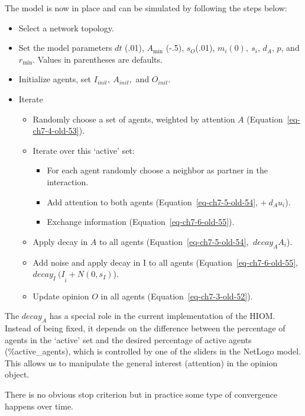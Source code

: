 \documentclass[
  letterpaper,
]{scrbook}
\begin{document}
The model is now in place and can be simulated by following the steps
below:

\begin{itemize}
\item
  Select a network topology.
\item
  Set the model parameters \(dt\) (.01), \(A_{\min}\) (-.5),
  \(s_{O}\)(.01), \(m_{i}(0),\ s_{i}\), \(d_{A}\), \(p\), and
  \(r_{\min}\). Values in parentheses are defaults.
\item
  Initialize agents, set \(I_{init},\ A_{init},\) and \(O_{init}\).
\item
  Iterate

  \begin{itemize}
  \item
    Randomly choose a set of agents, weighted by attention \(A\)
    (Equation~\ref{eq-ch7-4-old-53}).
  \item
    Iterate over this `active' set:

    \begin{itemize}
    \item
      For each agent randomly choose a neighbor as partner in the
      interaction.
    \item
      Add attention to both agents (Equation~\ref{eq-ch7-5-old-54},
      \(+ \ d_{A}u_{i}\)).
    \item
      Exchange information (Equation~\ref{eq-ch7-6-old-55}).
    \end{itemize}
  \item
    Apply decay in \(A\) to all agents (Equation~\ref{eq-ch7-5-old-54},
    \({\ decay}_{A}A_{i}\)).
  \item
    Add noise and apply decay in I to all agents
    (Equation~\ref{eq-ch7-6-old-55},
    \({decay_{I}\ (I}_{i} + Ν(0,s_{I})\)).
  \item
    Update opinion \(O\) in all agents (Equation~\ref{eq-ch7-3-old-52}).
  \end{itemize}
\end{itemize}

The \({decay}_{A}\) has a special role in the current implementation of
the HIOM. Instead of being fixed, it depends on the difference between
the percentage of agents in the `active' set and the desired percentage
of active agents (\%active\_agents), which is controlled by one of the
sliders in the NetLogo model. This allows us to manipulate the general
interest (attention) in the opinion object.

There is no obvious stop criterion but in practice some type of
convergence happens over time.
\end{document}
